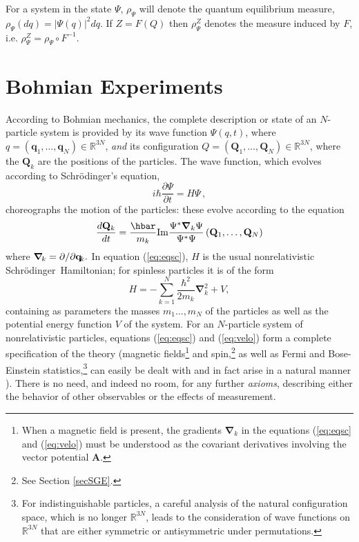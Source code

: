 \documentclass[12pt]{article}
\newcommand{\Sc}{Schr\"{o}dinger}
\newcommand{\se}{Schr\"odinger's equation}
\newcommand{\BM}{Bohmian mechanics}
\newcommand{\wf}{wave function}
\newcommand{\mybold}[1]{\mbox{\boldmath $#1$}}
\newcommand{\rvect}[2]{(#1_1,\ldots,#1_#2)}
\newcommand{\pder}[2]{\frac{\partial #1}{\partial #2}}
\newcommand{\oder}[2]{\frac{ d #1}{ d #2}}
\newcommand{\R}{\mathbb{R}}
\begin{document}
For a system in the state $\Psi$, $\rho_{\Psi}$ will denote the
quantum equilibrium measure, $\rho_{\Psi}(dq)= |\Psi(q)|^2dq$.  If
$Z=F(Q)$ then $\rho_{\Psi}^Z$ denotes the measure induced by $F$, i.e.
$\rho_{\Psi}^Z= \rho_{\Psi}\circ F^{-1}$.


\section{Bohmian Experiments}\label{sec:BE}
\setcounter{equation}{0}
\label{sec:BM}

According to \BM{}, the complete description or state of an
$N$-particle system is provided by its \wf{} $\Psi(q,t)$, where
$q=\rvect{\mathbf{q}}{N} \in \R ^{3N}$, \emph{and} its configuration
$Q= \rvect{\mathbf{Q}}{N}\in \R ^{3N}$, where the $\mathbf{Q}_k$ are
the positions of the particles.  The \wf{}, which evolves according to
\se{},
%
\begin{equation}
i\hbar\pder{\Psi}{t} = H\Psi \,,
\label{eq:eqsc}
\end{equation}
%
choreographs the motion of the particles: these evolve according to
the equation
%
\begin{equation}
\oder{\mathbf{Q}_{k}}{t} = \frac{\hbar}{m_{k}} {\rm Im}\frac{
\Psi^*\boldsymbol{\nabla}_{k}\Psi}{\Psi^*\Psi}\,
\rvect{\mathbf{Q}}{N}
\label{eq:velo}
\end{equation}
%
where $\mybold{\nabla}_{\!k}=\partial/\partial \mathbf{q}_{\!k}.$ In
equation (\ref{eq:eqsc}), $H$ is the usual nonrelativistic \Sc\
Hamiltonian; for spinless particles it is of the form
%
\begin{equation}
H=-{\sum}_{k=1}^{N}
\frac{{\hbar}^{2}}{2m_{k}}\boldsymbol{\nabla}^{2}_{k} + V,
\label{sh}
\end{equation}
%
containing as parameters the masses $m_1\dots, m_N$ of the particles
as well as the potential energy function $V$ of the system.  For an
$N$-particle system of nonrelativistic particles, equations
(\ref{eq:eqsc}) and (\ref{eq:velo}) form a complete specification of
the theory (magnetic fields\footnote{When a magnetic field is present,
   the gradients $\boldsymbol{\nabla}_{k}$ in the equations
   (\ref{eq:eqsc} and (\ref{eq:velo}) must be understood as the
   covariant derivatives involving the vector potential
   $\boldsymbol{A}$.  } and spin,\footnote{See Section \ref{secSGE}.}
as well as Fermi and Bose-Einstein statistics,\footnote{For
   indistinguishable particles, a careful analysis \cite{DGZ94} of the
   natural configuration space, which is no longer $\R^{3N}$, leads to
   the consideration of \wf s on $\R^{3N}$ that are either symmetric or
   antisymmetric under permutations.} can easily be dealt with and in
fact arise in a natural manner \cite{Bel66,Boh52,Nel85,Gol87,DGZ94}).
There is no need, and indeed no room, for any further \emph{axioms},
describing either the behavior of other observables or the effects of
measurement.
\end{document}
